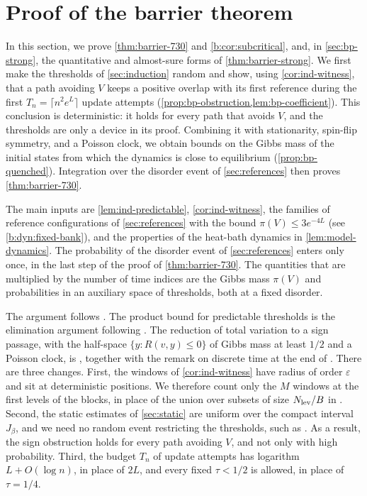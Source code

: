 \chapter{Proof of the barrier theorem}\label{sec:barrier-proof}

In this section, we prove \cref{thm:barrier-730} and \cref{b:cor:subcritical}, and, in \cref{sec:bp-strong}, the quantitative and almost-sure forms of \cref{thm:barrier-strong}. We first make the thresholds of \cref{sec:induction} random and show, using \cref{cor:ind-witness}, that a path avoiding $V$ keeps a positive overlap with its first reference during the first $T_n=\lceil n^2e^{L}\rceil$ update attempts (\cref{prop:bp-obstruction,lem:bp-coefficient}). This conclusion is deterministic: it holds for every path that avoids $V$, and the thresholds are only a device in its proof. Combining it with stationarity, spin-flip symmetry, and a Poisson clock, we obtain bounds on the Gibbs mass of the initial states from which the dynamics is close to equilibrium (\cref{prop:bp-quenched}). Integration over the disorder event of \cref{sec:references} then proves \cref{thm:barrier-730}.

The main inputs are \cref{lem:ind-predictable}, \cref{cor:ind-witness}, the families of reference configurations of \cref{sec:references} with the bound $\pi(V)\le3e^{-4L}$ (see \eqref{b:dyn:fixed-bank}), and the properties of the heat-bath dynamics in \cref{lem:model-dynamics}. The probability of the disorder event of \cref{sec:references} enters only once, in the last step of the proof of \cref{thm:barrier-730}. The quantities that are multiplied by the number of time indices are the Gibbs mass $\pi(V)$ and probabilities in an auxiliary space of thresholds, both at a fixed disorder.

The argument follows \cite[Sections~8.1 and~8.5]{oai-barriers}. The product bound for predictable thresholds is the elimination argument following \cite[(8.28)]{oai-barriers}. The reduction of total variation to a sign passage, with the half-space $\{y:R(v,y)\le0\}$ of Gibbs mass at least $1/2$ and a Poisson clock, is \cite[(8.1)--(8.3)]{oai-barriers}, together with the remark on discrete time at the end of \cite[Section~8.5]{oai-barriers}. There are three changes. First, the windows of \cref{cor:ind-witness} have radius of order $\varepsilon$ and sit at deterministic positions. We therefore count only the $M$ windows at the first levels of the blocks, in place of the union over subsets of size $N_{\rm lev}/B$ in \cite[(8.29)]{oai-barriers}. Second, the static estimates of \cref{sec:static} are uniform over the compact interval $J_\beta$, and we need no random event restricting the thresholds, such as \cite[(8.12)]{oai-barriers}. As a result, the sign obstruction holds for every path avoiding $V$, and not only with high probability. Third, the budget $T_n$ of update attempts has logarithm $L+O(\log n)$, in place of $2L$, and every fixed $\tau<1/2$ is allowed, in place of $\tau=1/4$.

